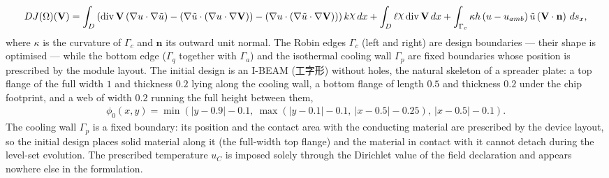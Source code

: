 \documentclass[preview]{standalone}
\let\oldcdot\cdot
\let\cdot\oldcdot
\begin{document}
\begin{dmath*}
DJ(\Omega)(\mathbf V) = \int_{D} \left(\operatorname{div} {\mathbf V} \left(  \nabla u  \cdot  \nabla \tilde u  \right) - \left(  \nabla \tilde u  \cdot \left(  \nabla u  \cdot  \nabla {\mathbf V}  \right) \right) - \left(  \nabla u  \cdot \left(  \nabla \tilde u  \cdot  \nabla {\mathbf V}  \right) \right)\right) k \raisebox{\depth}{$\chi$} \,dx + \int_{D} \ell \raisebox{\depth}{$\chi$} \operatorname{div} {\mathbf V} \,dx + \int_{\Gamma_c} \kappa h \left( u - u_{amb}\right) \tilde u \left(\mathbf V \cdot \mathbf n\right) \,ds_x ,
\end{dmath*}
where $\kappa$ is the curvature of $\Gamma_c$ and $\mathbf n$ its outward unit normal.  The Robin edges $\Gamma_c$ (left and right) are design boundaries — their shape is optimised — while the bottom edge ($\Gamma_q$ together with $\Gamma_a$) and the isothermal cooling wall $\Gamma_p$ are fixed boundaries whose position is prescribed by the module layout.
The initial design is an I-BEAM (工字形) without holes, the natural skeleton of a spreader plate: a top flange of the full width $1$ and thickness $0.2$ lying along the cooling wall, a bottom flange of length $0.5$ and thickness $0.2$ under the chip footprint, and a web of width $0.2$ running the full height between them,
\begin{align*}
\phi_0(x,y) = \min\left( \left| y - 0.9 \right| - 0.1 ,\ \max\left( \left| y - 0.1 \right| - 0.1 ,\ \left| x - 0.5 \right| - 0.25 \right),\ \left| x - 0.5 \right| - 0.1 \right).
\end{align*}
The cooling wall $\Gamma_p$ is a fixed boundary: its position and the contact area with the conducting material are prescribed by the device layout, so the initial design places solid material along it (the full-width top flange) and the material in contact with it cannot detach during the level-set evolution.  The prescribed temperature $u_C$ is imposed solely through the Dirichlet value of the field declaration and appears nowhere else in the formulation.
\end{document}

